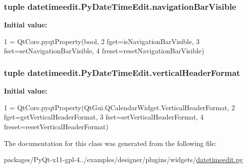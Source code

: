\subsubsection[{navigation\+Bar\+Visible}]{\setlength{\rightskip}{0pt plus 5cm}tuple datetimeedit.\+Py\+Date\+Time\+Edit.\+navigation\+Bar\+Visible\hspace{0.3cm}{\ttfamily [static]}}\label{classdatetimeedit_1_1PyDateTimeEdit_a09672d719eac0485720c60b9b8a71c59}
{\bfseries Initial value\+:}
\begin{DoxyCode}
1 = QtCore.pyqtProperty(bool,
2                                                fget=isNavigationBarVisible,
3                                                fset=setNavigationBarVisible,
4                                                freset=resetNavigationBarVisible)
\end{DoxyCode}
\hypertarget{classdatetimeedit_1_1PyDateTimeEdit_acc06801e078f9e685b599284e78d5c92}{}
\subsubsection[{vertical\+Header\+Format}]{\setlength{\rightskip}{0pt plus 5cm}tuple datetimeedit.\+Py\+Date\+Time\+Edit.\+vertical\+Header\+Format\hspace{0.3cm}{\ttfamily [static]}}\label{classdatetimeedit_1_1PyDateTimeEdit_acc06801e078f9e685b599284e78d5c92}
{\bfseries Initial value\+:}
\begin{DoxyCode}
1 = QtCore.pyqtProperty(QtGui.QCalendarWidget.VerticalHeaderFormat,
2                                                fget=getVerticalHeaderFormat,
3                                                fset=setVerticalHeaderFormat,
4                                                freset=resetVerticalHeaderFormat)
\end{DoxyCode}


The documentation for this class was generated from the following file\+:\begin{DoxyCompactItemize}
\item 
packages/\+Py\+Qt-\/x11-\/gpl-\/4../examples/designer/plugins/widgets/\hyperlink{datetimeedit_8py}{datetimeedit.\+py}\end{DoxyCompactItemize}
